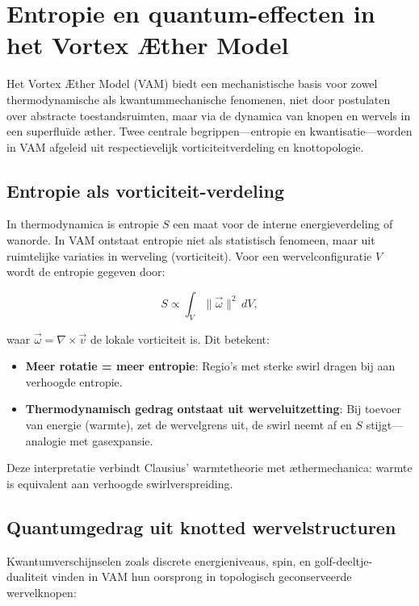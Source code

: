 
\section{Entropie en quantum-effecten in het Vortex Æther Model}

Het Vortex Æther Model (VAM) biedt een mechanistische basis voor zowel thermodynamische als kwantummechanische fenomenen, niet door postulaten over abstracte toestandsruimten, maar via de dynamica van knopen en wervels in een superfluïde æther. Twee centrale begrippen—entropie en kwantisatie—worden in VAM afgeleid uit respectievelijk vorticiteitverdeling en knottopologie.

\subsection{Entropie als vorticiteit-verdeling}

In thermodynamica is entropie $S$ een maat voor de interne energieverdeling of wanorde. In VAM ontstaat entropie niet als statistisch fenomeen, maar uit ruimtelijke variaties in werveling (vorticiteit). Voor een wervelconfiguratie $V$ wordt de entropie gegeven door:

\begin{equation}
S \propto \int_V \|\vec{\omega}\|^2 \, dV,
\end{equation}

waar $\vec{\omega} = \nabla \times \vec{v}$ de lokale vorticiteit is. Dit betekent:

\begin{itemize}
    \item \textbf{Meer rotatie = meer entropie}: Regio's met sterke swirl dragen bij aan verhoogde entropie.
    \item \textbf{Thermodynamisch gedrag ontstaat uit werveluitzetting}: Bij toevoer van energie (warmte), zet de wervelgrens uit, de swirl neemt af en $S$ stijgt—analogie met gasexpansie.
\end{itemize}

Deze interpretatie verbindt Clausius’ warmtetheorie met æthermechanica: warmte is equivalent aan verhoogde swirlverspreiding.

\subsection{Quantumgedrag uit knotted wervelstructuren}

Kwantumverschijnselen zoals discrete energieniveaus, spin, en golf-deeltje-dualiteit vinden in VAM hun oorsprong in topologisch geconserveerde wervelknopen:


